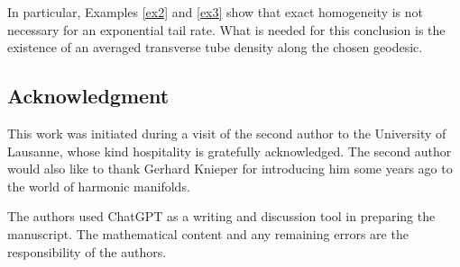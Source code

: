 \documentclass[11pt,a4paper]{article}
\theoremstyle{plain}
\theoremstyle{definition}
\theoremstyle{remark}
\begin{document}
In particular, Examples \ref{ex2} and \ref{ex3}  show that exact homogeneity is not necessary for an exponential
tail rate. What is needed for this conclusion is the existence of an averaged
transverse tube density along the chosen geodesic.


\subsection*{Acknowledgment}
This work was initiated during a visit of the second author to the University of Lausanne, whose kind hospitality is gratefully acknowledged. The second author would also like to thank Gerhard Knieper for introducing him some years ago to the world of harmonic manifolds.

The authors used ChatGPT as a writing and discussion tool in preparing the manuscript. The mathe\-matical content and any remaining errors are the responsibility of the authors.


{}
\end{document}
